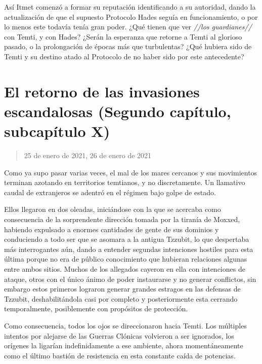\documentclass[
  spanish,
]{book}
\begin{document}
Así Itmet comenzó a formar su reputación identificando a su autoridad, dando la actualización de que el supuesto Protocolo Hades seguía en funcionamiento, o por lo menos este todavía tenía gran poder. ¿Qué tienen que ver \emph{//los guardianes//} con Temti, y con Hades? ¿Serán la esperanza que retorne a Temti al glorioso pasado, o la prolongación de épocas más que turbulentas? ¿Qué hubiera sido de Temti y su destino atado al Protocolo de no haber sido por este antecedente?

\hypertarget{el-retorno-de-las-invasiones-escandalosas-segundo-capuxedtulo-subcapuxedtulo-x}{%
\section{El retorno de las invasiones escandalosas (Segundo capítulo, subcapítulo X)}\label{el-retorno-de-las-invasiones-escandalosas-segundo-capuxedtulo-subcapuxedtulo-x}}

\begin{quote}
25 de enero de 2021, 26 de enero de 2021
\end{quote}

Como ya supo pasar varias veces, el mal de los mares cercanos y sus movimientos terminan azotando en territorios temtianos, y no discretamente. Un llamativo caudal de extranjeros se adentró en el régimen bajo golpe de estado.

Ellos llegaron en dos oleadas, iniciándose con la que se acercaba como consecuencia de la sorprendente dirección tomada por la tiranía de Moxxed, habiendo expulsado a enormes cantidades de gente de sus dominios y conduciendo a todo ser que se asomara a la antigua Tzzubit, lo que despertaba más interrogantes aún, dando a entender segundas intenciones hostiles para esta última porque no era de público conocimiento que hubieran relaciones algunas entre ambos sitios.
Muchos de los allegados cayeron en ella con intenciones de ataque, otros con el único ánimo de poder instaurarse y no generar conflictos, sin embargo estos primeros lograron generar grandes estragos en las defensas de Tzzubit, deshabilitándola casi por completo y posteriormente esta cerrando temporalmente, posiblemente con propósitos de protección.

Como consecuencia, todos los ojos se direccionaron hacia Temti. Los múltiples intentos por alejarse de las Guerras Clónicas volvieron a ser ignorados, los orígenes la ligarían indefinidamente a ese ambiente, ahora momentáneamente como el último bastión de resistencia en esta constante caída de potencias.
\end{document}
